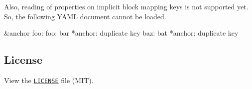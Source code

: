 Also, reading of properties on implicit block mapping keys is not supported yet. So, the following Y\+A\+ML document cannot be loaded.


\begin{DoxyCode}
&anchor foo:
  foo: bar
  *anchor: duplicate key
  baz: bat
  *anchor: duplicate key
\end{DoxyCode}


\subsection*{License}

View the \href{https://github.com/nodeca/js-yaml/blob/master/LICENSE}{\tt L\+I\+C\+E\+N\+SE} file (M\+IT). 